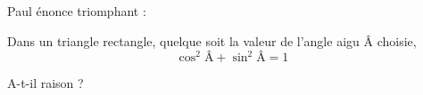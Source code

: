 
Paul énonce triomphant :

Dans un triangle rectangle, quelque soit la valeur de l'angle aigu $Â$ choisie,
$$\cos^2Â +\sin^2Â = 1$$

A-t-il raison ?




